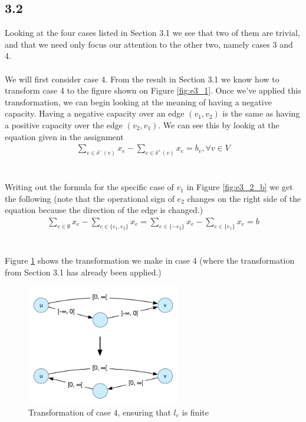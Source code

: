 \documentclass[12pt]{article}
\begin{document}
\subsection*{3.2}
Looking at the four cases listed in Section 3.1 we see that two of them are trivial, and that we need only focus our attention to the other two, namely cases 3 and 4.\\
\\
We will first consider case 4. From the result in Section 3.1 we know how to transform case 4 to the figure shown on Figure \ref{fig:e3_1}. Once we've applied this transformation, we can begin looking at the meaning of having a negative capacity. Having a negative capacity over an edge $(v_1, v_2)$ is the same as having a positive capacity over the edge $(v_2, v_1)$. We can see this by lookig at the equation given in the assignment
\begin{align*}
    \sum_{e\in \delta^-(v)}{x_e}-\sum_{e\in \delta^+(v)}{x_e} = b_v, \forall{v} \in V
\end{align*}~\\
\\
Writing out the formula for the specific case of $v_1$ in Figure \ref{fig:e3_2_b} we get the following (note that the operational sign of $e_2$ changes on the right side of the equation because the direction of the edge is changed.)
\begin{align*}
    \sum_{e\in \emptyset}{x_e} - \sum_{e\in \{e_1, e_2\}}{x_e} =
    \sum_{e\in \{-e_2\}}{x_e} - \sum_{e\in \{e_1\}}{x_e} = b
\end{align*}~\\
\\
Figure \ref{fig:e3_2} shows the transformation we make in case 4 (where the transformation from Section 3.1 has already been applied.)

\begin{figure}[h]
  \centering
    \includegraphics[width=0.6\textwidth]{figures/e3_2}
  \caption{Transformation of case 4, ensuring that $l_e$ is finite}
  \label{fig:e3_2}
\end{figure}
\end{document}
